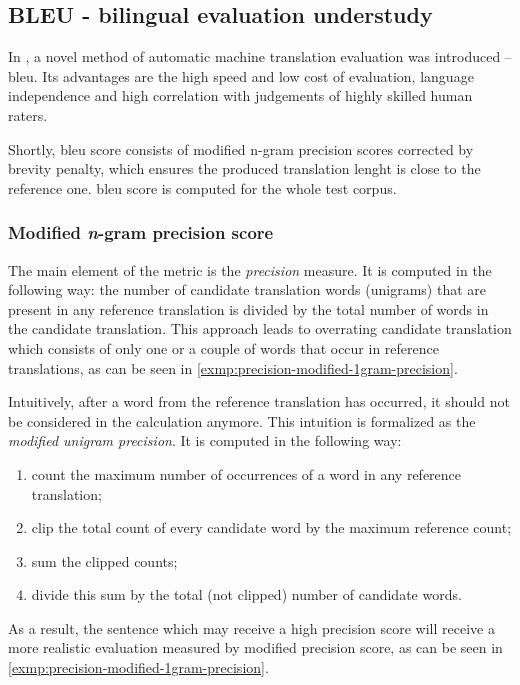 \subsection{BLEU - bilingual evaluation understudy}

In \cite{Papineni02bleu}, a novel method of automatic machine
translation evaluation was introduced -- \acrfull{bleu}.
Its advantages are the high speed and low cost of evaluation,
language independence and high correlation with judgements
of highly skilled human raters.

Shortly, \acrshort{bleu} score consists of modified n-gram precision scores
corrected by brevity penalty,
which ensures the produced translation lenght is close to the reference one.
\acrshort{bleu} score is computed for the whole test corpus.

\subsubsection*{Modified \textit{n}-gram precision score}

The main element of the metric is the \textit{precision} measure.
It is computed in the following way:
the number of candidate translation words (unigrams) that are present in
any reference translation is divided by the total number of words in the candidate translation.
This approach leads to overrating candidate translation which consists of only one
or a couple of words that occur in reference translations, as can be seen in
\cref{exmp:precision-modified-1gram-precision}.

Intuitively, after a word from the reference translation has occurred,
it should not be considered in the calculation anymore.
This intuition is formalized as the \textit{modified unigram precision}.
It is computed in the following way:
\begin{enumerate}
	\item count the maximum number of occurrences of a word in any reference translation;
	\item clip the total count of every candidate word by the maximum reference count;
	\item sum the clipped counts;
	\item divide this sum by the total (not clipped) number of candidate words.
\end{enumerate}
As a result, the sentence which may receive a high precision score will receive a
more realistic evaluation measured by modified precision score, as can be seen in
\cref{exmp:precision-modified-1gram-precision}.

